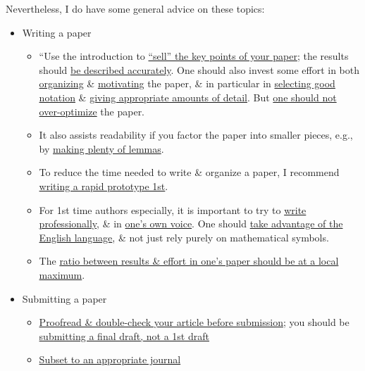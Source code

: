 \documentclass[oneside]{book}
\numberwithin{equation}{section}
\begin{document}
Nevertheless, I do have some general advice on these topics:
\begin{itemize}
	\item Writing a paper
	\begin{itemize}
		\item ``Use the introduction to \href{https://terrytao.wordpress.com/advice-on-writing-papers/use-the-introduction-to-%E2%80%9Csell%E2%80%9D-the-key-points-of-your-paper/}{``sell'' the key points of your paper}; the results should \href{https://terrytao.wordpress.com/advice-on-writing-papers/describe-the-results-accurately/}{be described accurately}. One should also invest some effort in both \href{https://terrytao.wordpress.com/advice-on-writing-papers/organise-the-paper/}{organizing} \& \href{https://terrytao.wordpress.com/advice-on-writing-papers/motivate-the-paper/}{motivating} the paper, \& in particular in \href{https://terrytao.wordpress.com/advice-on-writing-papers/use-good-notation/}{selecting good notation} \& \href{https://terrytao.wordpress.com/advice-on-writing-papers/give-appropriate-amounts-of-detail/}{giving appropriate amounts of detail}. But \href{https://terrytao.wordpress.com/advice-on-writing-papers/dont-overoptimise/}{one should not over-optimize} the paper.
		\item It also assists readability if you factor the paper into smaller pieces, e.g., by \href{https://terrytao.wordpress.com/advice-on-writing-papers/create-lemmas/}{making plenty of lemmas}.
		\item To reduce the time needed to write \& organize a paper, I recommend \href{https://terrytao.wordpress.com/advice-on-writing-papers/write-a-rapid-prototype-first/}{writing a rapid prototype 1st}.
		\item For 1st time authors especially, it is important to try to \href{https://terrytao.wordpress.com/advice-on-writing-papers/write-professionally/}{write professionally}, \& in \href{https://terrytao.wordpress.com/advice-on-writing-papers/write-in-your-own-voice/}{one's own voice}. One should \href{https://terrytao.wordpress.com/advice-on-writing-papers/take-advantage-of-the-english-language/}{take advantage of the English language}, \& not just rely purely on mathematical symbols.
		\item The \href{https://terrytao.wordpress.com/advice-on-writing-papers/maximising-the-results-to-effort-ratio/}{ratio between results \& effort in one's paper should be at a local maximum}.
	\end{itemize}
	\item Submitting a paper
	\begin{itemize}
		\item \href{https://terrytao.wordpress.com/advice-on-writing-papers/proofread-and-double-check-your-paper-before-submission/}{Proofread \& double-check your article before submission}; you should be \href{https://terrytao.wordpress.com/advice-on-writing-papers/submit-a-final-draft-not-a-first-draft/}{submitting a final draft, not a 1st draft}
		\item \href{https://terrytao.wordpress.com/advice-on-writing-papers/submit-to-an-appropriate-journal/}{Subset to an appropriate journal}
	\end{itemize}
\end{itemize}
\end{document}
